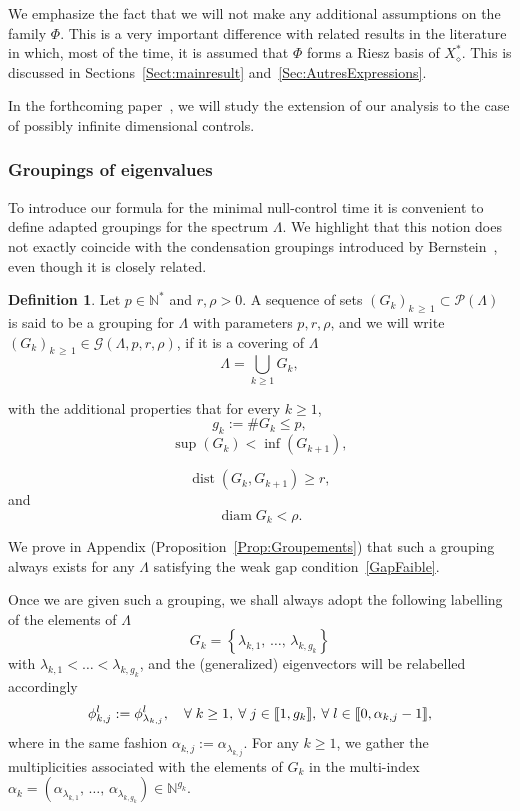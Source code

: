 \documentclass[11pt]{article}
\theoremstyle{definition}
\newtheorem{defi}[theo]{Definition}
\numberwithin{equation}{section}
\numberwithin{figure}{section}
\numberwithin{table}{section}
\newcommand{\llbracket}{\mathopen{[\mkern -2.7mu[}}
\newcommand{\rrbracket}{\mathclose{]\mkern -2.7mu]}}
\newcommand{\inter}[2]{\llbracket #1,#2 \rrbracket}
\newcommand{\Xalphas}{X_\diamond^*}
\newcommand{\n}{g}
\newcommand{\N}{\mathbb{N}}
\DeclareMathOperator{\diam}{diam}
\DeclareMathOperator{\dist}{dist}
\let\oldforall\forall
\renewcommand*{\forall}{\mathrel{\oldforall}}
\begin{document}
We emphasize the fact that we will not make any additional assumptions on the family $\Phi$. This is a very important difference with related results in the literature in which, most of the time, it is assumed that $\Phi$ forms a Riesz basis of $\Xalphas$. This is discussed in Sections~\ref{Sect:mainresult} and~\ref{Sec:AutresExpressions}.


In the forthcoming paper~\cite{BoyerMorancey}, we will study the extension of our analysis to the case of possibly infinite dimensional controls.


\subsubsection{Groupings of eigenvalues} \label{Sec:Groupings}
To introduce our formula for the minimal null-control time it is convenient to define adapted groupings for the spectrum $\Lambda$. We highlight that this notion does not exactly coincide with the condensation groupings introduced by Bernstein~\cite{Bernstein33}, even though it is closely related.
\begin{defi} \label{Def:Groupements}
Let $p \in \N^*$ and $r,\rho >0$. A sequence of sets $(G_k)_{k\,\geq\,1} \subset \mathcal{P}(\Lambda)$ is said to be a grouping for $\Lambda$ with parameters $p, r, \rho$, and we will write $(G_k)_{k\,\geq \,1} \in \mathcal{G}(\Lambda,p,r,\rho)$, if it is a covering of $\Lambda$
\[
\Lambda = \bigcup\limits_{k \geq 1} G_k,
\]
\goodbreak

with the additional properties that for every $k \geq 1$,
\[
\n_k := \# G_k \leq p,
\]
\[
\sup(G_k) < \inf(G_{k+1}),
\]

\begin{equation}\label{ConstructionGroupement_distance}
\dist (G_k, G_{k+1}) \geq r,
\end{equation}
and
\begin{equation}\label{ConstructionGroupement_diametre}
\diam G_k < \rho.
\end{equation}
\end{defi}

We prove in Appendix (Proposition~\ref{Prop:Groupements}) that such a grouping always exists for any $\Lambda$ satisfying the weak gap condition~\eqref{GapFaible}.

Once we are given such a grouping, we shall always adopt the following labelling of the elements of $\Lambda$
\[
G_k = \left\{ \lambda_{k,1},\,\dots,\, \lambda_{k,\n_k} \right\}
\]
with $\lambda_{k,1} < \dots < \lambda_{k,\n_k}$, and the (generalized) eigenvectors will be relabelled accordingly
\[
\phi_{k,j}^l := \phi_{\lambda_{k,j}}^l, \quad \forall k\geq 1, \: \forall j\in \inter{1}{\n_k}, \: \forall l \in \inter{0}{\alpha_{k,j}-1},
\]
where in the same fashion $\alpha_{k,j} := \alpha_{\lambda_{k,j}}$. For any $k \geq 1$, we gather the multiplicities associated with the elements of $G_k$ in the multi-index $\alpha_k=(\alpha_{\lambda_{k,1}},\,\dotsc,\, \alpha_{\lambda_{k,\n_k}})\in \N^{\n_k}$.
\end{document}
